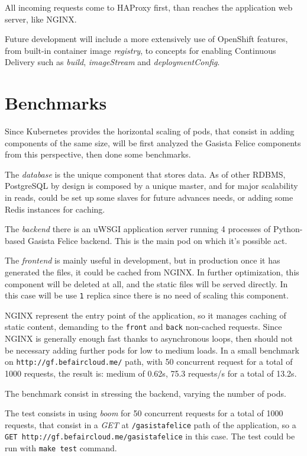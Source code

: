 All incoming requests come to HAProxy first, than reaches the application web server, like NGINX.

Future development will include a more extensively use of OpenShift features, from built-in container image \textit{registry}, to concepts for enabling Continuous Delivery such as \textit{build}, \textit{imageStream} and \textit{deploymentConfig}.

\section{Benchmarks}\label{benchmarks}

Since Kubernetes provides the horizontal scaling of pods, that consist in adding components of the same size, will be first analyzed the Gasista Felice components from this perspective, then done some benchmarks.

The \textit{database} is the unique component that stores data.  As of other RDBMS, PostgreSQL by design is composed by a unique master, and for major scalability in reads, could be set up some slaves for future advances needs, or adding some Redis instances for caching.

The \textit{backend} there is an uWSGI application server running 4 processes of Python-based Gasista Felice backend.  This is the main pod on which it's possible act.

The \textit{frontend} is mainly useful in development, but in production once it has generated the files, it could be cached from NGINX. In further optimization, this component will be deleted at all, and the static files will be served directly. In this case will be use \texttt{1} replica since there is no need of scaling this component.

NGINX  represent the entry point of the application, so it manages caching of static content, demanding to the \texttt{front} and \texttt{back} non-cached requests. Since NGINX is generally enough fast thanks to asynchronous loops, then should not be necessary adding further pods for low to medium loads.  In a small benchmark on \texttt{http://gf.befaircloud.me/} path, with 50 concurrent request for a total of 1000 requests, the result is:  medium of 0.62s, 75.3 requests/s for a total of 13.2s.

The benchmark consist in stressing the backend, varying the number of pods.

The test consists in using \textit{boom} for 50 concurrent requests for a total of 1000 requests, that consist in a \emph{GET} at \texttt{/gasistafelice} path of the application, so a \texttt{GET\ http://gf.befaircloud.me/gasistafelice} in this case.  The test could be run with \texttt{make test} command.


